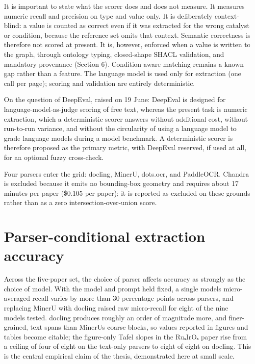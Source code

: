 It is important to state what the scorer does and does not measure. It
measures numeric recall and precision on type and value only. It is
deliberately context-blind: a value is counted as correct even if it was
extracted for the wrong catalyst or condition, because the reference set
omits that context. Semantic correctness is therefore not scored at
present. It is, however, enforced when a value is written to the graph,
through ontology typing, closed-shape SHACL validation, and mandatory
provenance (Section 6). Condition-aware matching remains a known gap
rather than a feature. The language model is used only for extraction
(one call per page); scoring and validation are entirely deterministic.

On the question of DeepEval, raised on 19 June: DeepEval is designed for
language-model-as-judge scoring of free text, whereas the present task
is numeric extraction, which a deterministic scorer answers without
additional cost, without run-to-run variance, and without the
circularity of using a language model to grade language models during a
model benchmark. A deterministic scorer is therefore proposed as the
primary metric, with DeepEval reserved, if used at all, for an optional
fuzzy cross-check.

Four parsers enter the grid: docling, MinerU, dots.ocr, and PaddleOCR.
Chandra is excluded because it emits no bounding-box geometry and
requires about 17 minutes per paper (\$0.105 per paper); it is reported
as excluded on these grounds rather than as a zero
intersection-over-union score.

\section{Parser-conditional extraction
accuracy}\label{parser-conditional-extraction-accuracy}

Across the five-paper set, the choice of parser affects accuracy as
strongly as the choice of model. With the model and prompt held fixed, a
single model\textquotesingle s micro-averaged recall varies by more than
30 percentage points across parsers, and replacing MinerU with docling
raised raw micro-recall for eight of the nine models tested. docling
produces roughly an order of magnitude more, and finer-grained, text
spans than MinerU\textquotesingle s coarse blocks, so values reported in
figures and tables become citable; the figure-only Tafel slopes in the
RuₓIrOₓ paper rise from a ceiling of four of eight on the text-only
parsers to eight of eight on docling. This is the central empirical
claim of the thesis, demonstrated here at small scale.

